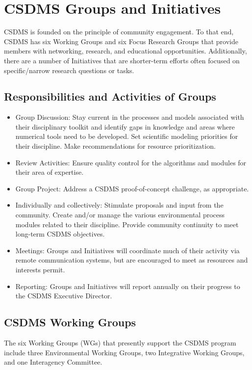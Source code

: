 \documentclass[11pt, oneside]{article}   	%
\def\article#1{
\renewcommand{\thesection}{Article \Roman{section}} 
\section[Article]{#1}
\renewcommand{\thesection}{\Roman{section}} 
}
\begin{document}
\article{CSDMS Groups and Initiatives}

CSDMS is founded on the principle of community engagement. To that end, CSDMS has six Working Groups and six Focus Research Groups that provide members with networking, research, and educational opportunities.  Additionally, there are a number of Initiatives that are shorter-term efforts often focused on specific/narrow research questions or tasks. 


\subsection{Responsibilities and Activities of Groups}

\begin{itemize}
\item Group Discussion: Stay current in the processes and models associated with their disciplinary toolkit and identify gaps in knowledge and areas where numerical tools need to be developed. Set scientific modeling priorities for their discipline. Make recommendations for resource prioritization.
\item Review Activities: Ensure quality control for the algorithms and modules for their area of expertise.  
\item Group Project: Address a CSDMS proof-of-concept challenge, as appropriate. 
\item Individually and collectively:  Stimulate proposals and input from the community. Create and/or manage the various environmental process modules related to their discipline. Provide community continuity to meet long-term CSDMS objectives.
\item Meetings: Groups and Initiatives will coordinate much of their activity via remote communication systems, but are encouraged to meet as resources and interests permit. 
\item Reporting: Groups and Initiatives will report annually on their progress to the CSDMS Executive Director.
\end{itemize}


\subsection{CSDMS Working Groups}

The six Working Groups (WGs) that presently support the CSDMS program include three Environmental Working Groups, two Integrative Working Groups, and one Interagency Committee.   
\end{document}
